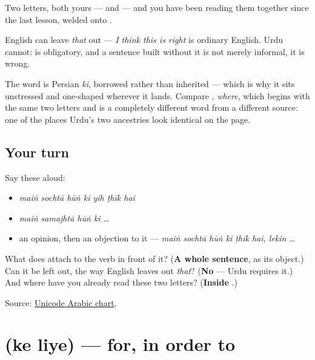 Two letters, both yours — \textbf{} and \textbf{} — and you have been reading them together since the last lesson, welded onto \textbf{}.

\begin{grammarlens}[title={Grammar Lens: what English drops and Urdu keeps}]
English can leave \emph{that} out — \emph{I think this is right} is ordinary English. Urdu cannot: \textbf{} is obligatory, and a sentence built without it is not merely informal, it is wrong.

The word is Persian \emph{ki}, borrowed rather than inherited — which is why it sits unstressed and one-shaped wherever it lands. Compare \textbf{}, \emph{where}, which begins with the same two letters and is a completely different word from a different source: one of the places Urdu's two ancestries look identical on the page.
\end{grammarlens}

\subsection*{Your turn}
Say these aloud:

\begin{itemize}
\raggedright
  \item \emph{maiṅ sochtā hūṅ ki yih ṭhīk hai}
  \item \emph{maiṅ samajhtā hūṅ ki …}
  \item an opinion, then an objection to it — \emph{maiṅ sochtā hūṅ ki ṭhīk hai, lekin …}
\end{itemize}

\begin{tcolorbox}[breakable,colback=teal!4,colframe=teal!35!black,title={Before you move on}]
What does \textbf{} attach to the verb in front of it? (\textbf{A whole sentence}, as its object.) Can it be left out, the way English leaves out \emph{that}? (\textbf{No} — Urdu requires it.) And where have you already read these two letters? (\textbf{Inside }.)

Source: \href{https://www.unicode.org/charts/PDF/U0600.pdf}{Unicode Arabic chart}.
\end{tcolorbox}
\section[\texorpdfstring{\ur{کے} \ur{لیے} (ke liye)}{کے لیے (ke liye)}]{  (ke liye) — for, in order to}

